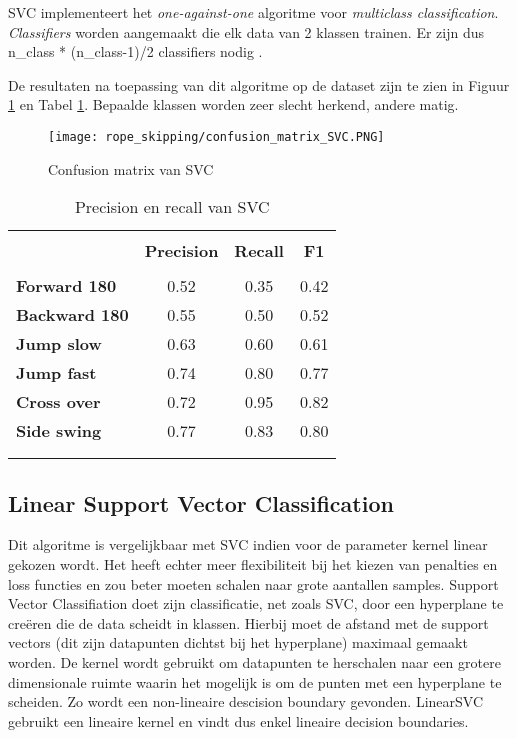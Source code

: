 SVC implementeert het \textit{one-against-one} algoritme voor \textit{multiclass classification}. \textit{Classifiers} worden aangemaakt die elk data van 2 klassen trainen. Er zijn dus  n\_class * (n\_class-1)/2 classifiers nodig \cite{ref31}.

De resultaten na toepassing van dit algoritme op de dataset zijn te zien in Figuur \ref{fig:SVC} en Tabel \ref{tab:svc_precision_recall}. Bepaalde klassen worden zeer slecht herkend, andere matig.

\begin{figure}[!htpd]
\centering
\caption{Confusion matrix van SVC}\label{fig:SVC}
\texttt{[image: rope\_skipping/confusion\_matrix\_SVC.PNG]} 
\end{figure}

\begin{table}[!htpd]
  \centering
  \caption{Precision en recall van SVC}
  \label{tab:svc_precision_recall}
\begin{tabular}{lccc}
 \hline \\
\textbf{}             & \textbf{Precision} & \textbf{Recall} & \textbf{F1} &  \\
\hline \\
\textbf{Forward 180}  & 0.52               & 0.35            & 0.42 & \\
\textbf{Backward 180} & 0.55               & 0.50            & 0.52 & \\
\textbf{Jump slow}    & 0.63               & 0.60            & 0.61 & \\
\textbf{Jump fast}    & 0.74               & 0.80            & 0.77 & \\
\textbf{Cross over}   & 0.72               & 0.95            & 0.82 & \\
\textbf{Side swing}   & 0.77               & 0.83            & 0.80 \\ \\
\hline \\
\end{tabular}
\end{table}

\subsection{Linear Support Vector Classification}

Dit algoritme is vergelijkbaar met SVC indien voor de parameter kernel linear gekozen wordt. Het heeft echter meer flexibiliteit bij het kiezen van penalties en loss functies en zou beter moeten schalen naar grote aantallen samples. 
Support Vector Classifiation doet zijn classificatie, net zoals SVC, door een hyperplane te creëren die de data scheidt in klassen. Hierbij moet de afstand met de support vectors (dit zijn datapunten dichtst bij het hyperplane) maximaal gemaakt worden.
De kernel wordt gebruikt om datapunten te herschalen naar een grotere dimensionale ruimte waarin het mogelijk is om de punten met een hyperplane te scheiden. Zo wordt een non-lineaire descision boundary gevonden. LinearSVC gebruikt een lineaire kernel en vindt dus enkel lineaire decision boundaries.

